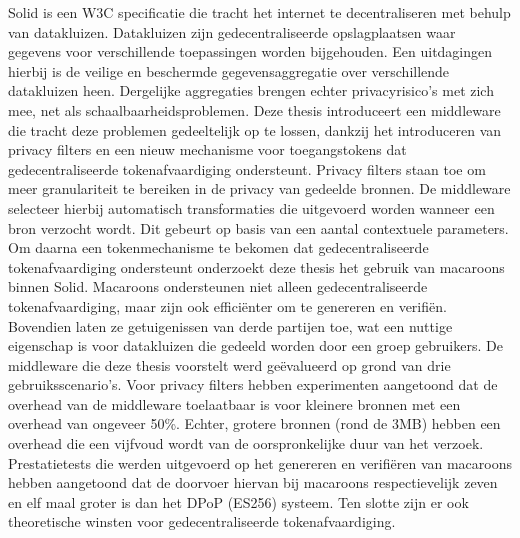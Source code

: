 {\small Solid is een W3C specificatie die tracht het internet te decentraliseren met behulp van datakluizen. Datakluizen zijn gedecentraliseerde opslagplaatsen waar gegevens voor verschillende toepassingen worden bijgehouden. Een uitdagingen hierbij is de veilige en beschermde gegevensaggregatie over verschillende datakluizen heen. Dergelijke aggregaties brengen echter privacyrisico's met zich mee, net als schaalbaarheidsproblemen. Deze thesis introduceert een middleware die tracht deze problemen gedeeltelijk op te lossen, dankzij het introduceren van privacy filters en een nieuw mechanisme voor toegangstokens dat gedecentraliseerde tokenafvaardiging ondersteunt.
Privacy filters staan toe om meer granulariteit te bereiken in de privacy van gedeelde bronnen. De middleware selecteer hierbij automatisch transformaties die uitgevoerd worden wanneer een bron verzocht wordt. Dit gebeurt op basis van een aantal contextuele parameters. Om daarna een tokenmechanisme te bekomen dat gedecentraliseerde tokenafvaardiging ondersteunt onderzoekt deze thesis het gebruik van macaroons binnen Solid. Macaroons ondersteunen niet alleen gedecentraliseerde tokenafvaardiging, maar zijn ook effici{\"e}nter om te genereren en verifi{\"e}n. Bovendien laten ze getuigenissen van derde partijen toe, wat een nuttige eigenschap is voor datakluizen die gedeeld worden door een groep gebruikers.
De middleware die deze thesis voorstelt werd ge{\"e}valueerd op grond van drie gebruiksscenario's. Voor privacy filters hebben experimenten aangetoond dat de overhead van de middleware toelaatbaar is voor kleinere bronnen met een overhead van ongeveer 50\%. Echter, grotere bronnen (rond de 3MB) hebben een overhead die een vijfvoud wordt van de oorspronkelijke duur van het verzoek. 
Prestatietests die werden uitgevoerd op het genereren en verifi{\"e}ren van macaroons hebben aangetoond dat de doorvoer hiervan bij macaroons respectievelijk zeven en elf maal groter is dan het DPoP (ES256) systeem. Ten slotte zijn er ook theoretische winsten voor gedecentraliseerde tokenafvaardiging.}\\